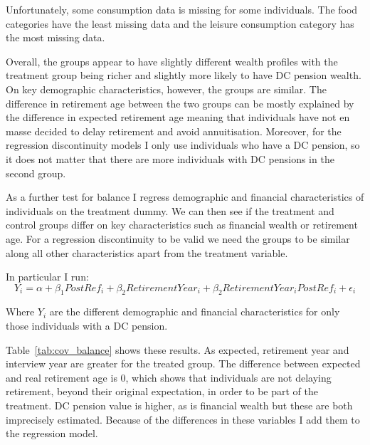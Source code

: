 \documentclass[12pt]{article}
\begin{document}
Unfortunately, some consumption data is missing for some individuals. The food
categories have the least missing data and the leisure consumption category has
the most missing data.

Overall, the groups appear to have slightly different wealth profiles with the
treatment group being richer and slightly more likely to have DC pension wealth.
On key demographic characteristics, however, the groups are similar. The
difference in retirement age between the two groups can be mostly explained by
the difference in expected retirement age meaning that individuals have not en
masse decided to delay retirement and avoid annuitisation. Moreover, for the
regression discontinuity models I only use individuals who have a DC pension, so
it does not matter that there are more individuals with DC pensions in the
second group.

\begin{landscape}
  \linespread{1.25}
  
  \normalsize
\end{landscape}

As a further test for balance I regress demographic and financial
characteristics of individuals on the treatment dummy. We can then see if the
treatment and control groups differ on key characteristics such as financial
wealth or retirement age. For a regression discontinuity to be valid we need the
groups to be similar along all other characteristics apart from the treatment
variable.

In particular I run:
\begin{equation*}
  Y_{i} = \alpha + \beta_{1} PostRef_{i} + \beta_{2} RetirementYear_{i}  + \beta_{2} RetirementYear_{i}PostRef_{i}  + \epsilon_{i}
\end{equation*}

Where $Y_{i}$ are the different demographic and financial characteristics for
only those individuals with a DC pension.

\linespread{1}

\linespread{1.5}

Table~\ref{tab:cov_balance} shows these results. As expected, retirement year
and interview year are greater for the treated group. The difference between
expected and real retirement age is 0, which shows that individuals are not
delaying retirement, beyond their original expectation, in order to be part of
the treatment. DC pension value is higher, as is financial wealth but these are
both imprecisely estimated. Because of the differences in these variables I add
them to the regression model.
\end{document}
